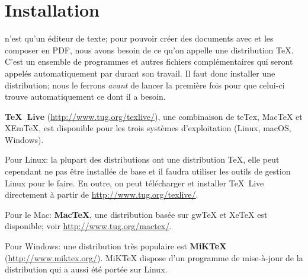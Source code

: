 
\chapter{Installation}
\label{chap.installation}

\Tw{} n'est qu'un éditeur de texte; pour pouvoir créer des documents avec \AllTeX{} et les composer en PDF, nous avons besoin de ce qu'on appelle une distribution \TeX{}. C'est un ensemble de programmes et autres fichiers complémentaires qui seront appelés automatiquement par \Tw{} durant son travail. Il faut donc installer une distribution; nous le ferrons \emph{avant} de lancer \Tw{} la première fois pour que celui-ci trouve automatiquement ce dont il a besoin.

\textbf{TeX~Live} (\url{http://www.tug.org/texlive/}), une combinaison de teTex, MacTeX et XEmTeX, est disponible pour les trois systèmes d'exploitation (Linux, macOS, Windows).

\begin{OSLinux}
Pour Linux: la plupart des distributions ont une distribution \TeX, elle peut cependant ne pas être installée de base et il faudra utiliser les outils de gestion Linux pour le faire. En outre, on peut télécharger et installer TeX~Live directement à partir de \url{http://www.tug.org/texlive/}.
\end{OSLinux}
\vspace{6pt} 

\begin{OSMac}
Pour le Mac: \textbf{MacTeX}, une distribution basée sur gwTeX et XeTeX est disponible; voir \url{http://www.tug.org/mactex/}.
\end{OSMac}
\vspace{6pt} 

\begin{OSWindows}
Pour Windows: une distribution très populaire est \textbf{MiKTeX} (\url{http://www.miktex.org/}). MiKTeX dispose d'un programme de mise-à-jour de la distribution qui a aussi été portée sur Linux.
\end{OSWindows}

